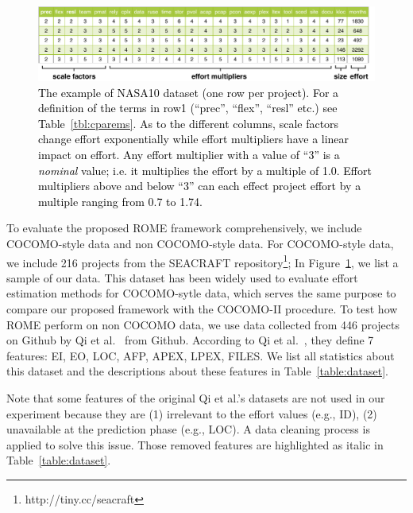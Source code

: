 \documentclass[sigconf,review]{acmart}
\newcommand{\tbl}[1]{Table~\ref{tbl:#1}}
\newcommand{\fig}[1]{Figure~\ref{fig:#1}}
\begin{document}
\begin{figure}
\centerline{\includegraphics[width=1\textwidth]{nasa10_table.pdf}}
\caption{\textcolor{black}{ The example of NASA10 dataset (one row per project). For a definition of the terms in row1 (``prec'', ``flex'', ``resl'' etc.) see \tbl{cparems}.
    As to the different columns, scale factors change effort exponentially while effort multipliers have a linear impact on effort.
    Any effort multiplier with a value of ``3'' is a {\em nominal} value; i.e. it multiplies the effort by a multiple of 1.0. Effort multipliers
    above and below ``3'' can each effect project effort by a multiple ranging from 0.7 to 1.74.  
    }}\label{fig:nasa10}
\end{figure}



To evaluate the proposed ROME framework comprehensively, we include COCOMO-style data and non COCOMO-style data. For COCOMO-style data, we include 216 projects from the SEACRAFT repository\footnote{http://tiny.cc/seacraft}; In \fig{nasa10}, we list a sample of our data. This dataset has been widely used to evaluate effort estimation methods for COCOMO-sytle data, which serves the same purpose to compare our proposed framework with the COCOMO-II procedure. 
To test how ROME perform on non COCOMO data, we use data  collected from  446 projects on Github by Qi et al.~\cite{qi2017software} from Github. 
According to Qi et al.~\cite{qi2017software}, they define 7 features: EI, EO, LOC, AFP, APEX, LPEX, FILES. We list all statistics about this dataset and the descriptions about these features in Table~\ref{table:dataset}. 

Note that some features of the original Qi et al.'s datasets are not used in our experiment because they are (1) irrelevant to the effort values (e.g., ID), (2) unavailable at the prediction phase (e.g., LOC). A data cleaning process is applied to solve this issue. 
Those removed features are highlighted as italic in Table~\ref{table:dataset}.
\end{document}
